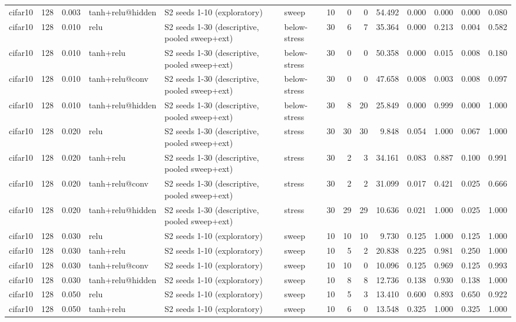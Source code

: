 \begin{table}[htbp]
{\begin{tabular}{@{}lrrlllrrrrrrrr@{}}
cifar10 & 128 & 0.003 & tanh+relu@hidden & S2 seeds 1-10 (exploratory) & sweep & 10 & 0 & 0 & 54.492 & 0.000 & 0.000 & 0.000 & 0.080 \\
cifar10 & 128 & 0.010 & relu & S2 seeds 1-30 (descriptive, pooled sweep+ext) & below-stress & 30 & 6 & 7 & 35.364 & 0.000 & 0.213 & 0.004 & 0.582 \\
cifar10 & 128 & 0.010 & tanh+relu & S2 seeds 1-30 (descriptive, pooled sweep+ext) & below-stress & 30 & 0 & 0 & 50.358 & 0.000 & 0.015 & 0.008 & 0.180 \\
cifar10 & 128 & 0.010 & tanh+relu@conv & S2 seeds 1-30 (descriptive, pooled sweep+ext) & below-stress & 30 & 0 & 0 & 47.658 & 0.008 & 0.003 & 0.008 & 0.097 \\
cifar10 & 128 & 0.010 & tanh+relu@hidden & S2 seeds 1-30 (descriptive, pooled sweep+ext) & below-stress & 30 & 8 & 20 & 25.849 & 0.000 & 0.999 & 0.000 & 1.000 \\
cifar10 & 128 & 0.020 & relu & S2 seeds 1-30 (descriptive, pooled sweep+ext) & stress & 30 & 30 & 30 & 9.848 & 0.054 & 1.000 & 0.067 & 1.000 \\
cifar10 & 128 & 0.020 & tanh+relu & S2 seeds 1-30 (descriptive, pooled sweep+ext) & stress & 30 & 2 & 3 & 34.161 & 0.083 & 0.887 & 0.100 & 0.991 \\
cifar10 & 128 & 0.020 & tanh+relu@conv & S2 seeds 1-30 (descriptive, pooled sweep+ext) & stress & 30 & 2 & 2 & 31.099 & 0.017 & 0.421 & 0.025 & 0.666 \\
cifar10 & 128 & 0.020 & tanh+relu@hidden & S2 seeds 1-30 (descriptive, pooled sweep+ext) & stress & 30 & 29 & 29 & 10.636 & 0.021 & 1.000 & 0.025 & 1.000 \\
cifar10 & 128 & 0.030 & relu & S2 seeds 1-10 (exploratory) & sweep & 10 & 10 & 10 & 9.730 & 0.125 & 1.000 & 0.125 & 1.000 \\
cifar10 & 128 & 0.030 & tanh+relu & S2 seeds 1-10 (exploratory) & sweep & 10 & 5 & 2 & 20.838 & 0.225 & 0.981 & 0.250 & 1.000 \\
cifar10 & 128 & 0.030 & tanh+relu@conv & S2 seeds 1-10 (exploratory) & sweep & 10 & 10 & 0 & 10.096 & 0.125 & 0.969 & 0.125 & 0.993 \\
cifar10 & 128 & 0.030 & tanh+relu@hidden & S2 seeds 1-10 (exploratory) & sweep & 10 & 8 & 8 & 12.736 & 0.138 & 0.930 & 0.138 & 1.000 \\
cifar10 & 128 & 0.050 & relu & S2 seeds 1-10 (exploratory) & sweep & 10 & 5 & 3 & 13.410 & 0.600 & 0.893 & 0.650 & 0.922 \\
cifar10 & 128 & 0.050 & tanh+relu & S2 seeds 1-10 (exploratory) & sweep & 10 & 6 & 0 & 13.548 & 0.325 & 1.000 & 0.325 & 1.000 \\

\end{tabular}}
\end{table}
